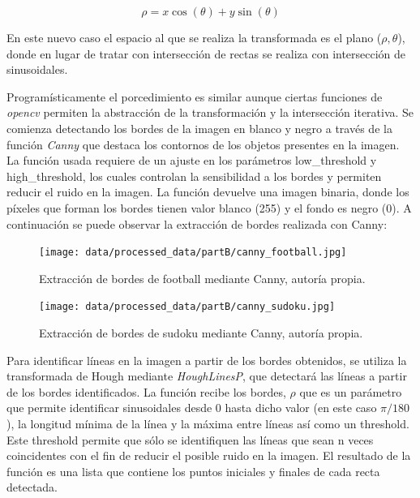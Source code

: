 \documentclass[a4paper,12pt]{article}
\begin{document}
{\vspace{0.5cm}

\begin{equation}
    \rho = x \cos(\theta) + y \sin(\theta)
\end{equation}

\vspace{0.5cm}

En este nuevo caso el espacio al que se realiza la transformada es el plano (\(\rho, \theta\)), donde en lugar de tratar con intersección de rectas se
realiza con intersección de sinusoidales.

\vspace{0.5cm}

Programísticamente el porcedimiento es similar aunque ciertas funciones de \textit{opencv} permiten la abstracción de la transformación y la intersección iterativa.
Se comienza detectando los bordes de la imagen en blanco y negro a través de la función \textit{Canny} que destaca los contornos de los objetos presentes en la imagen. 
La función usada requiere de un ajuste en los parámetros low\_threshold y high\_threshold, los cuales controlan la sensibilidad a los bordes y permiten 
reducir el ruido en la imagen. La función devuelve una imagen binaria, donde los píxeles que forman los bordes tienen valor blanco (255) y el fondo es negro (0).
A continuación se puede observar la extracción de bordes realizada con Canny:

\vspace{0.5cm}

\begin{figure}[h!]
    \centering
    \begin{minipage}[b]{0.35\textwidth}
        \centering
        \texttt{[image: data/processed\_data/partB/canny\_football.jpg]}
        \caption{Extracción de bordes de football mediante Canny, autoría propia.}
        \label{fig:canny-football}
    \end{minipage}
    \hfill
    \begin{minipage}[b]{0.45\textwidth}
        \centering
        \texttt{[image: data/processed\_data/partB/canny\_sudoku.jpg]}
        \caption{Extracción de bordes de sudoku mediante Canny, autoría propia.}
        \label{fig:canny-sudoku}
    \end{minipage}

\end{figure}

\vspace{0.5cm}

Para identificar líneas en la imagen a partir de los bordes obtenidos, se utiliza la transformada de Hough mediante \textit{HoughLinesP}, que detectará
las líneas a partir de los bordes identificados. La función recibe los bordes, $\rho$ que es un parámetro que permite identificar sinusoidales desde 0 hasta dicho valor (en este caso 
$\pi/180$), la longitud mínima de la línea y la máxima entre líneas así como un threshold. Este threshold permite que sólo se identifiquen las líneas que sean n veces coincidentes
con el fin de reducir el posible ruido en la imagen. El resultado de la función es una lista que contiene los puntos iniciales y finales de cada recta detectada. 

}
\end{document}
